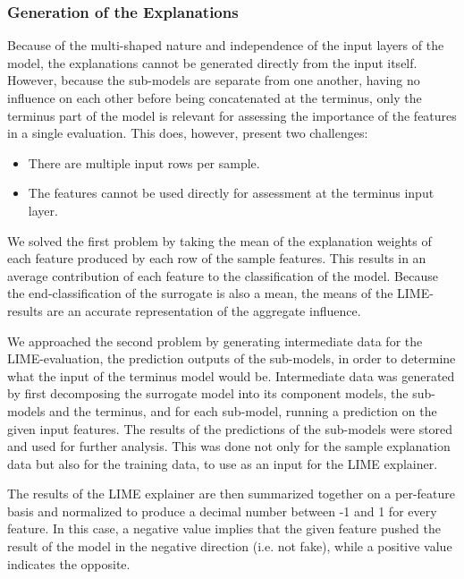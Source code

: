 \documentclass{article}
\begin{document}
			\subsubsection{Generation of the Explanations}
			Because of the multi-shaped nature and independence of the input layers of the model,
			the explanations cannot be generated directly from the input itself. However, because
			the sub-models are separate from one another, having no influence on each other before
			being concatenated at the terminus, only the terminus part of the model is relevant
			for assessing the importance of the features in a single evaluation. This does,
			however, present two challenges:
			\begin{itemize}
				\item There are multiple input rows per sample.
				\item The features cannot be used directly for assessment at the terminus input
					layer.
			\end{itemize}
			We solved the first problem by taking the mean of the explanation weights of each
			feature produced by each row of the sample features. This results in an average
			contribution of each feature to the classification of the model. Because the
			end-classification of the surrogate is also a mean, the means of the LIME-results are
			an accurate representation of the aggregate influence.
			\par
			We approached the second problem by generating intermediate data for the
			LIME-evaluation, the prediction outputs of the sub-models, in order to determine what
			the input of the terminus model would be. Intermediate data was generated by first
			decomposing the surrogate model into its component models, the sub-models and the
			terminus, and for each sub-model, running a prediction on the given input features.
			The results of the predictions of the sub-models were stored and used for further
			analysis. This was done not only for the sample explanation data but also for the
			training data, to use as an input for the LIME explainer.
			\par
			The results of the LIME explainer are then summarized together on a per-feature basis
			and normalized to produce a decimal number between -1 and 1 for every feature. In this
			case, a negative value implies that the given feature pushed the result of the model
			in the negative direction (i.e. not fake), while a positive value indicates the
			opposite.
\end{document}
